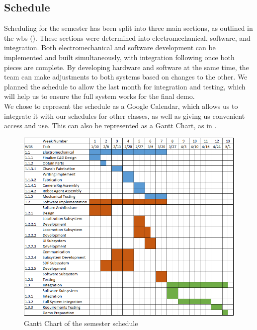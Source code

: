 \clearpage 

\subsection{Schedule}
\label{sec:schedule}
Scheduling for the semester has been split into three main sections, as outlined in the wbs (). These sections were determined into electromechanical, software, and integration. Both electromechanical and software development can be implemented and built simultaneously, with integration following once both pieces are complete. By developing hardware and software at the same time, the team can make adjustments to both systems based on changes to the other. We planned the schedule to allow the last month for integration and testing, which will help us to ensure the full system works for the final demo. \\
We chose to represent the schedule as a Google Calendar, which allows us to integrate it with our schedules for other classes, as well as giving us convenient access and use. This can also be represented as a Gantt Chart, as in .

\begin{figure}[ht!]
 \centering
  \includegraphics[width=0.99\columnwidth]{figures/gantt_chart.png}
  \caption{Gantt Chart of the semester schedule}
 \label{fig:gantt_chart}
\end{figure}
